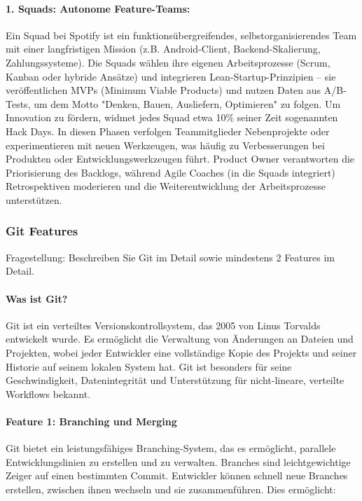 \paragraph{1. Squads: Autonome Feature-Teams:}Ein Squad bei Spotify ist ein funktionsübergreifendes, selbstorganisierendes Team mit einer langfristigen Mission (z.B. Android-Client, Backend-Skalierung, Zahlungssysteme). 
Die Squads wählen ihre eigenen Arbeitsprozesse (Scrum, Kanban oder hybride Ansätze) und integrieren Lean-Startup-Prinzipien – sie veröffentlichen MVPs (Minimum Viable Products) und nutzen Daten aus A/B-Tests, um dem Motto "Denken, Bauen, Ausliefern, Optimieren" zu folgen.
Um Innovation zu fördern, widmet jedes Squad etwa 10\% seiner Zeit sogenannten Hack Days. In diesen Phasen verfolgen Teammitglieder Nebenprojekte oder experimentieren mit neuen Werkzeugen, was häufig zu Verbesserungen bei Produkten oder Entwicklungswerkzeugen führt. Product Owner verantworten die Priorisierung des Backlogs, während Agile Coaches (in die Squads integriert) Retrospektiven moderieren und die Weiterentwicklung der Arbeitsprozesse unterstützen.
\subsubsection{Git Features}

Fragestellung: Beschreiben Sie Git im Detail sowie mindestens 2 Features im Detail.

\paragraph{Was ist Git?}
Git ist ein verteiltes Versionskontrollsystem, das 2005 von Linus Torvalds entwickelt wurde.
Es ermöglicht die Verwaltung von Änderungen an Dateien und Projekten,
wobei jeder Entwickler eine vollständige Kopie des Projekts und seiner Historie auf seinem lokalen System hat.
Git ist besonders für seine Geschwindigkeit, Datenintegrität und Unterstützung für nicht-lineare, verteilte 
Workflows bekannt. \cite{github-git}

\paragraph{Feature 1: Branching und Merging}
Git bietet ein leistungsfähiges Branching-System, das es ermöglicht, parallele Entwicklungslinien 
zu erstellen und zu verwalten. Branches sind leichtgewichtige Zeiger auf einen bestimmten Commit. 
Entwickler können schnell neue Branches erstellen, zwischen ihnen wechseln und sie zusammenführen. 
Dies ermöglicht:

